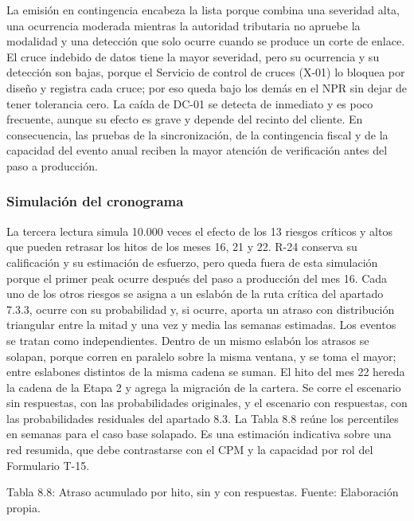 \documentclass[11pt]{article}
\begin{document}
La emisión en contingencia encabeza la lista porque combina una severidad alta, una ocurrencia moderada mientras la autoridad tributaria no apruebe la modalidad y una detección que solo ocurre cuando se produce un corte de enlace. El cruce indebido de datos tiene la mayor severidad, pero su ocurrencia y su detección son bajas, porque el Servicio de control de cruces (X-01) lo bloquea por diseño y registra cada cruce; por eso queda bajo los demás en el NPR sin dejar de tener tolerancia cero. La caída de DC-01 se detecta de inmediato y es poco frecuente, aunque su efecto es grave y depende del recinto del cliente. En consecuencia, las pruebas de la sincronización, de la contingencia fiscal y de la capacidad del evento anual reciben la mayor atención de verificación antes del paso a producción.

\subsubsection{Simulación del cronograma}

La tercera lectura simula 10.000 veces el efecto de los 13 riesgos críticos y altos que pueden retrasar los hitos de los meses 16, 21 y 22. R-24 conserva su calificación y su estimación de esfuerzo, pero queda fuera de esta simulación porque el primer peak ocurre después del paso a producción del mes 16. Cada uno de los otros riesgos se asigna a un eslabón de la ruta crítica del apartado 7.3.3, ocurre con su probabilidad y, si ocurre, aporta un atraso con distribución triangular entre la mitad y una vez y media las semanas estimadas. Los eventos se tratan como independientes. Dentro de un mismo eslabón los atrasos se solapan, porque corren en paralelo sobre la misma ventana, y se toma el mayor; entre eslabones distintos de la misma cadena se suman. El hito del mes 22 hereda la cadena de la Etapa 2 y agrega la migración de la cartera. Se corre el escenario sin respuestas, con las probabilidades originales, y el escenario con respuestas, con las probabilidades residuales del apartado 8.3. La Tabla 8.8 reúne los percentiles en semanas para el caso base solapado. Es una estimación indicativa sobre una red resumida, que debe contrastarse con el CPM y la capacidad por rol del Formulario T-15.

Tabla 8.8: Atraso acumulado por hito, sin y con respuestas. Fuente: Elaboración propia.\label{tab:8-8}
\end{document}

